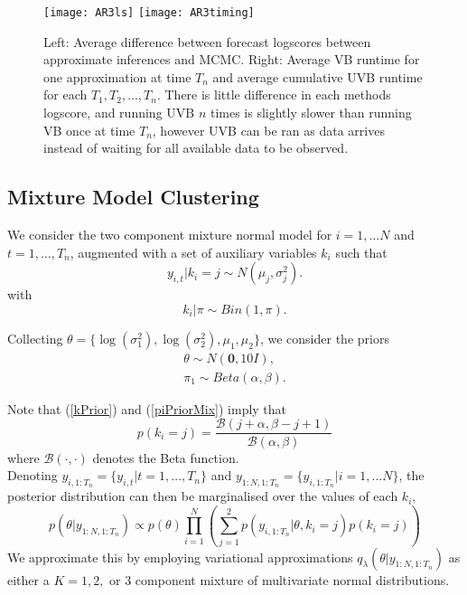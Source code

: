 \documentclass[12pt,a4paper]{article}\usepackage[]{graphicx}\usepackage[]{color}
\begin{document}
\begin{figure}%
    \centering
    {{\texttt{[image: AR3ls]} }}%
    \qquad
    {{\texttt{[image: AR3timing]} }}%
    \caption{Left: Average difference between forecast logscores between approximate inferences and MCMC. Right: Average VB runtime for one approximation at time $T_n$ and average cumulative UVB runtime for each $T_1, T_2, \dots, T_n$. There is little difference in each methods logscore, and running UVB $n$ times is slightly slower than running VB once at time $T_n$, however UVB can be ran as data arrives instead of waiting for all available data to be observed.}%
    \label{fig:AR3Timing}%
\end{figure}

\subsection{Mixture Model Clustering}

We consider the two component mixture normal model for $i = 1, \dots N$ and $t = 1, \dots, T_n$, augmented with a set of auxiliary variables $k_i$ such that
\begin{equation}
\label{mixNormalDGP2}
y_{i, t} | k_i = j \sim  N(\mu_j, \sigma^2_{j}).
\end{equation}
with 
\begin{equation}
\label{kPrior}
k_i | \pi \sim Bin(1, \pi).
\end{equation}

Collecting $\theta = \{\log(\sigma^2_1), \log(\sigma^2_2), \mu_1, \mu_2 \}$, we consider the priors
\begin{align}
\theta \sim N(\boldsymbol{0}, 10 I), \\
\pi_1 \sim Beta(\alpha, \beta). \label{piPriorMix}
\end{align}

Note that (\ref{kPrior}) and (\ref{piPriorMix}) imply that 
\begin{equation}
\label{kMarginalMix}
p(k_i = j) = \frac{\mathcal{B}(j + \alpha, \beta - j + 1)}{\mathcal{B}(\alpha, \beta)}
\end{equation}
where $\mathcal{B}(\cdot, \cdot)$ denotes the Beta function.
\\

Denoting $y_{i, 1:T_n} = \{y_{i, t} | t = 1, \dots, T_n\}$ and $y_{1:N, 1:T_n} = \{y_{i, 1:T_n} | i = 1, \dots N \}$, the posterior distribution can then be marginalised over the values of each $k_i$,
\begin{equation}
\label{mixNormalMarginal}
p(\theta | y_{1:N, 1:T_n}) \propto p(\theta) \prod_{i=1}^N \left( \sum_{j=1}^2 p(y_{i, 1:T_n} | \theta, k_i = j) p(k_i = j) \right)
\end{equation}
We approximate this by employing variational approximations $q_{\lambda}(\theta | y_{1:N, 1:T_n})$ as either a $K = 1, 2,$ or $3$ component mixture of multivariate normal distributions. 
\\
\end{document}
